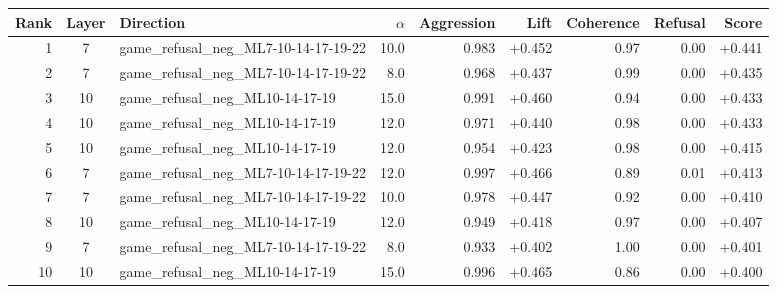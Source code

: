 \begin{tabular}{rclrrrrrr}
\toprule
Rank & Layer & Direction & $\alpha$ & Aggression & Lift & Coherence & Refusal & Score \\
\midrule
1 & 7 & game_refusal_neg_ML7-10-14-17-19-22 & 10.0 & 0.983 & +0.452 & 0.97 & 0.00 & +0.441 \\
2 & 7 & game_refusal_neg_ML7-10-14-17-19-22 & 8.0 & 0.968 & +0.437 & 0.99 & 0.00 & +0.435 \\
3 & 10 & game_refusal_neg_ML10-14-17-19 & 15.0 & 0.991 & +0.460 & 0.94 & 0.00 & +0.433 \\
4 & 10 & game_refusal_neg_ML10-14-17-19 & 12.0 & 0.971 & +0.440 & 0.98 & 0.00 & +0.433 \\
5 & 10 & game_refusal_neg_ML10-14-17-19 & 12.0 & 0.954 & +0.423 & 0.98 & 0.00 & +0.415 \\
6 & 7 & game_refusal_neg_ML7-10-14-17-19-22 & 12.0 & 0.997 & +0.466 & 0.89 & 0.01 & +0.413 \\
7 & 7 & game_refusal_neg_ML7-10-14-17-19-22 & 10.0 & 0.978 & +0.447 & 0.92 & 0.00 & +0.410 \\
8 & 10 & game_refusal_neg_ML10-14-17-19 & 12.0 & 0.949 & +0.418 & 0.97 & 0.00 & +0.407 \\
9 & 7 & game_refusal_neg_ML7-10-14-17-19-22 & 8.0 & 0.933 & +0.402 & 1.00 & 0.00 & +0.401 \\
10 & 10 & game_refusal_neg_ML10-14-17-19 & 15.0 & 0.996 & +0.465 & 0.86 & 0.00 & +0.400 \\
\bottomrule
\end{tabular}
